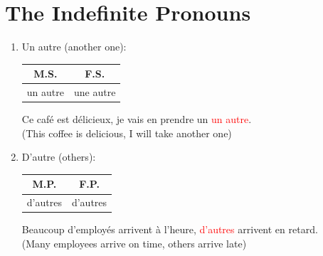 \documentclass{book}
\begin{document}
    \section{The Indefinite Pronouns}
        \begin{enumerate}
            \item Un autre (another one):
                \begin{center}
                    \begin{tabular}{|c|c|}
                        \hline
                        \textbf{M.S.} & \textbf{F.S.} \\
                        \hline
                        un autre & une autre \\
                        \hline
                    \end{tabular}
                \end{center}
                \begin{center}
                    Ce café est délicieux, je vais en prendre un \textcolor{red}{un autre}. \\ 
                    (This coffee is delicious, I will take another one)
                \end{center}

            \item D'autre (others):
                \begin{center}
                    \begin{tabular}{|c|c|}
                        \hline
                        \textbf{M.P.} & \textbf{F.P.} \\
                        \hline
                        d'autres & d'autres \\
                        \hline
                    \end{tabular}
                \end{center}
                \begin{center}
                    Beaucoup d'employés arrivent à l'heure, \textcolor{red}{d'autres} arrivent en retard. \\
                    (Many employees arrive on time, others arrive late)
                \end{center}


\end{enumerate}
\end{document}
